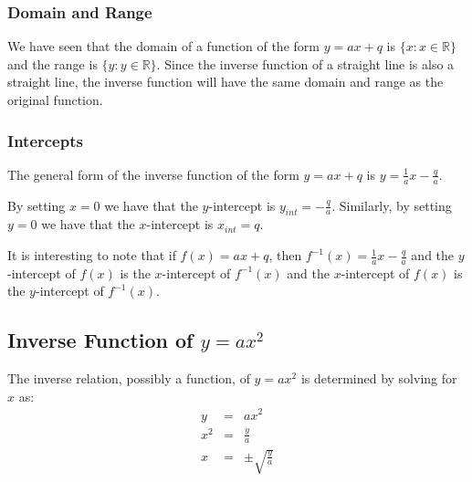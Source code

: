 \subsubsection{Domain and Range}
We have seen that the domain of a function of the form $y=ax+q$ is $\{x:x\in\mathbb{R}\}$ and the range is $\{y:y\in\mathbb{R}\}$. Since the inverse function of a straight line is also a straight line, the inverse function will have the same domain and range as the original function.

\subsubsection{Intercepts}
The general form of the inverse function of the form $y=ax+q$ is $y=\frac{1}{a}x-\frac{q}{a}$.

By setting $x=0$ we have that the $y$-intercept is $y_{int}=-\frac{q}{a}$. Similarly, by setting $y=0$ we have that the $x$-intercept is $x_{int}=q$.

It is interesting to note that if $f(x)=ax+q$, then $f^{-1}(x)=\frac{1}{a}x-\frac{q}{a}$ and the $y$-intercept of $f(x)$ is the $x$-intercept of $f^{-1}(x)$ and the $x$-intercept of $f(x)$ is the $y$-intercept of $f^{-1}(x)$.

\subsection{Inverse Function of $y=ax^2$}
The inverse relation, possibly a function, of $y=ax^2$ is determined by solving for $x$ as:
\begin{eqnarray}
y&=&ax^2\\
x^2&=&\frac{y}{a}\\
x&=&\pm\sqrt{\frac{y}{a}}
\end{eqnarray}

